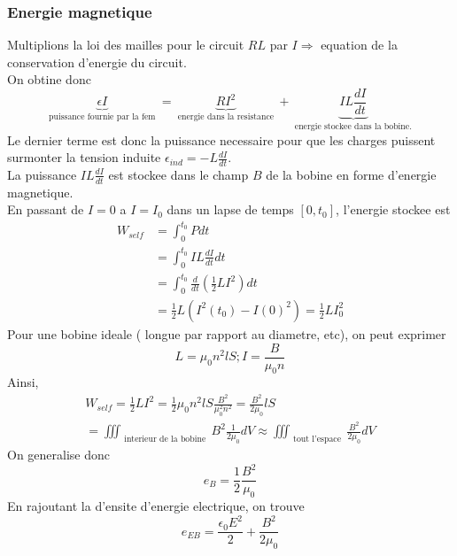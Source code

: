 \documentclass[../main.tex]{subfiles}
\begin{document}
\subsubsection{Energie magnetique}
Multiplions la loi des mailles pour le circuit $RL$ par $I \Rightarrow $ equation de la conservation d'energie du circuit.\\
On obtine donc
\[ 
\underbrace{\epsilon I}_{ \text{ puissance fournie par la fem } } = \underbrace{RI^{2}}_{ \text{ energie dans la resistance } } + \underbrace{IL \frac{dI}{dt}}_{ \text{ energie stockee dans la bobine. } }
\]
Le dernier terme est donc la puissance necessaire pour que les charges puissent surmonter la tension induite $\epsilon_{ind} = - L \frac{dI}{dt}$.\\
La puissance $IL \frac{dI}{dt}$ est stockee dans le champ $B$ de la bobine en forme d'energie magnetique.\\
En passant de $I=0$ a $I= I_0$ dans un lapse de temps $[0, t_0]$, l'energie stockee est
\begin{align*}
	W_{self } &= \int_{ 0 }^{ t_0 }P dt \\
		  &= \int_{ 0 }^{ t_0 }I L \frac{dI}{dt}dt\\
		  &= \int_{ 0 }^{ t_0 }\frac{d}{dt}( \frac{1}{2}L I^{2}) dt\\
		  &= \frac{1}{2} L ( I^{2}( t_0) - I( 0)^{2} )  = \frac{1}{2}L I_0^{2}
\end{align*}
Pour une bobine ideale ( longue par rapport au diametre, etc), on peut exprimer
\[ 
L= \mu_0 n^{2} l S; I = \frac{B}{\mu_0 n}
\]
Ainsi,
\begin{align*}

W_{self}  = \frac{1}{2}L I^{2} = \frac{1}{2}\mu_0 n^{2}l S \frac{B^{2}}{\mu_0^{2}n^{2}} = \frac{B^{2}}{ 2 \mu_0} l S\\
= \iiint_{ \text{ interieur de la bobine } } B^{2} \frac{1}{2\mu_0}dV \approx \iiint_{ \text{ tout l'espace } } \frac{B^{2}}{2\mu_0}dV
\end{align*}
On generalise donc
\[ 
e_B = \frac{1}{2}\frac{B^{2}}{\mu_0}
\]
En rajoutant la d'ensite d'energie electrique, on trouve
\[ 
e_{EB} = \frac{\epsilon_0 E^{2}}{2} + \frac{B^{2}}{2 \mu_0}
\]
	
\end{document}
